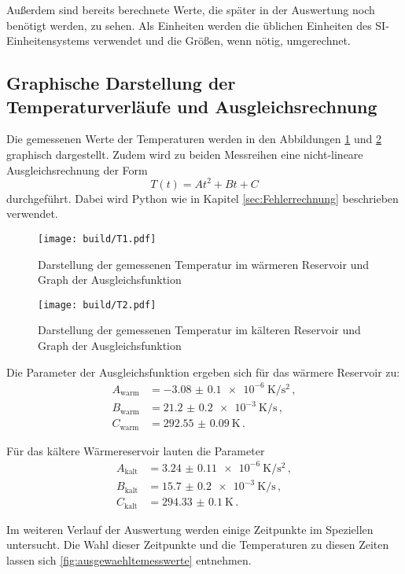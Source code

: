 Außerdem sind bereits berechnete Werte,
die später in der Auswertung noch benötigt werden, zu sehen. Als Einheiten werden
die üblichen Einheiten des SI-Einheitensystems verwendet und die Größen, wenn nötig,
umgerechnet.

\subsection{Graphische Darstellung der Temperaturverläufe und Ausgleichsrechnung}
Die gemessenen Werte der Temperaturen werden in den Abbildungen \ref{fig:temp1} und \ref{fig:temp2}
graphisch dargestellt. Zudem wird zu beiden Messreihen eine nicht-lineare
Ausgleichsrechnung der Form
\begin{equation}
  T(t)=At^2+Bt+C
\end{equation}
durchgeführt. Dabei wird Python wie in Kapitel \ref{sec:Fehlerrechnung} beschrieben
verwendet.

\begin{figure}
  \centering
  \texttt{[image: build/T1.pdf]}
  \caption{Darstellung der gemessenen Temperatur im wärmeren Reservoir
   und Graph der Ausgleichsfunktion}
  \label{fig:temp1}
\end{figure}

\begin{figure}
  \centering
  \texttt{[image: build/T2.pdf]}
  \caption{Darstellung der gemessenen Temperatur im kälteren Reservoir
   und Graph der Ausgleichsfunktion}
  \label{fig:temp2}
\end{figure}

Die Parameter der Ausgleichsfunktion ergeben sich für das wärmere Reservoir zu:
\begin{align*}
  A_\text{warm}&=\SI{-3.08(010)e-6}{\kelvin\per\second\squared}  \,, \\
  B_\text{warm}&=\SI{21.2(02)e-3}{\kelvin\per\second} \,,  \\
  C_\text{warm}&=\SI{292.55(009)}{\kelvin}  \,.
\end{align*}

Für das kältere Wärmereservoir lauten die Parameter
\begin{align*}
  A_\text{kalt}&=\SI{3.24(011)e-6}{\kelvin\per\second\squared}  \,, \\
  B_\text{kalt}&=\SI{15.7(02)e-3}{\kelvin\per\second} \,,  \\
  C_\text{kalt}&=\SI{294.33(010)}{\kelvin}  \,.
\end{align*}

Im weiteren Verlauf der Auswertung werden einige Zeitpunkte im Speziellen untersucht.
Die Wahl dieser Zeitpunkte und die Temperaturen zu diesen Zeiten lassen sich
\ref{fig:ausgewaehltemesswerte} entnehmen.


